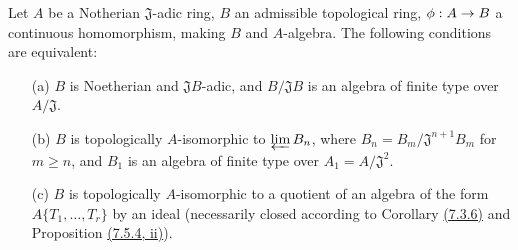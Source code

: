 \begin{prop}[7.5.5]
\label{prop-0.7.5.5}
Let $A$ be a Notherian $\mathfrak{J}$-adic ring, $B$ an admissible topological ring,
$\phi:A\to B$ a continuous homomorphism, making $B$ and $A$-algebra. The following
conditions are equivalent:
\begin{itemize}
  \item[{\rm(a)}] $B$ is Noetherian and $\mathfrak{J}B$-adic, and $B/\mathfrak{J}B$ is an
    algebra of finite type over $A/\mathfrak{J}$.
  \item[{\rm(b)}] $B$ is topologically $A$-isomorphic to $\varprojlim B_n$, where
    $B_n=B_m/\mathfrak{J}^{n+1}B_m$ for $m\geqslant n$, and $B_1$ is an algebra of finite
    type over $A_1=A/\mathfrak{J}^2$.
  \item[{\rm(c)}] $B$ is topologically $A$-isomorphic to a quotient of an algebra of the form
    $A\{T_1,\dots,T_r\}$ by an ideal (necessarily closed according to
    Corollary \hyperref[cor-0.7.3.6]{(7.3.6)} and Proposition \hyperref[prop-0.7.5.4]{(7.5.4, ii)}).
\end{itemize}
\end{prop}

